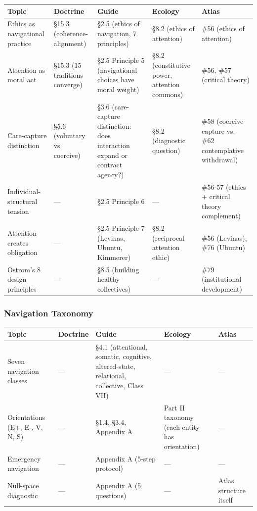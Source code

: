 {\small
\begin{longtable}{>{\raggedright\arraybackslash}p{} >{\raggedright\arraybackslash}p{} >{\raggedright\arraybackslash}p{} >{\raggedright\arraybackslash}p{} >{\raggedright\arraybackslash}p{}}
\toprule
\textbf{Topic} & \textbf{Doctrine} & \textbf{Guide} & \textbf{Ecology} & \textbf{Atlas} \\
\midrule
\endhead
Ethics as navigational practice & §15.3 (coherence-alignment) & §2.5 (ethics of navigation, 7 principles) & §8.2 (ethics of attention) & \#56 (ethics of attention) \\
Attention as moral act & §15.3 (15 traditions converge) & §2.5 Principle 5 (navigational choices have moral weight) & §8.2 (constitutive power, attention commons) & \#56, \#57 (critical theory) \\
Care-capture distinction & §5.6 (voluntary vs. coercive) & §3.6 (care-capture distinction: does interaction expand or contract agency?) & §8.2 (diagnostic question) & \#58 (coercive capture vs. \#62 contemplative withdrawal) \\
Individual-structural tension & — & §2.5 Principle 6 & — & \#56-57 (ethics + critical theory complement) \\
Attention creates obligation & — & §2.5 Principle 7 (Levinas, Ubuntu, Kimmerer) & §8.2 (reciprocal attention ethic) & \#56 (Levinas), \#76 (Ubuntu) \\
Ostrom's 8 design principles & — & §8.5 (building healthy collectives) & — & \#79 (institutional development) \\
\bottomrule
\end{longtable}
}



\subsubsection*{Navigation Taxonomy}



{\small
\begin{longtable}{>{\raggedright\arraybackslash}p{} >{\raggedright\arraybackslash}p{} >{\raggedright\arraybackslash}p{} >{\raggedright\arraybackslash}p{} >{\raggedright\arraybackslash}p{}}
\toprule
\textbf{Topic} & \textbf{Doctrine} & \textbf{Guide} & \textbf{Ecology} & \textbf{Atlas} \\
\midrule
\endhead
Seven navigation classes & — & §4.1 (attentional, somatic, cognitive, altered-state, relational, collective, Class VII) & — & — \\
Orientations (E+, E-, V, N, S) & — & §1.4, §3.4, Appendix A & Part II taxonomy (each entity has orientation) & — \\
Emergency navigation & — & Appendix A (5-step protocol) & — & — \\
Null-space diagnostic & — & Appendix A (5 questions) & — & Atlas structure itself \\
\bottomrule
\end{longtable}
}




